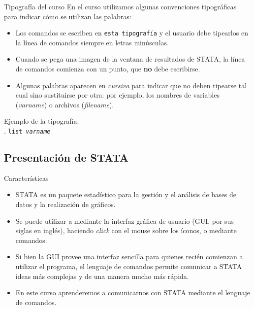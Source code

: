 \documentclass{beamer}
\begin{document}
\begin{frame}{Tipografía del curso}
En el curso utilizamos algunas convenciones tipográficas para indicar cómo se utilizan las palabras: 
\begin{itemize}
\item Los  comandos se escriben en \texttt{esta tipografía} y el usuario debe tipearlos en la línea de comandos siempre en letras minúsculas.
\item Cuando se pega una imagen de la ventana de resultados de STATA, la línea de comandos comienza con un punto, que \textbf{no} debe escribirse.  
\item Algunas palabras aparecen en \textit{cursiva} para indicar que no deben tipearse tal cual sino sustituirse por otra: por ejemplo, los nombres de variables (\textit{varname}) o archivos (\textit{filename}). 
\end{itemize}
\medskip
Ejemplo de la tipografía:\\
. \texttt{list \textit{varname}}
\end{frame}

\subsection{Presentación de STATA}


\begin{frame}{Características}
 \begin{itemize}
\item STATA es un paquete estadístico para la gestión y el análisis de bases de datos y la realización de gráficos. 
\item Se puede utilizar a mediante la interfaz gráfica de usuario (GUI, por sus siglas en inglés), haciendo \textit{click} con el mouse sobre los íconos, o mediante comandos.
\item Si bien la GUI provee una interfaz sencilla para quienes recién comienzan a utilizar el programa, el lenguaje de comandos permite comunicar a STATA ideas más complejas y de una manera mucho más rápida.
\item En este curso aprenderemos a comunicarnos con STATA mediante el lenguaje de comandos.
\end{itemize}
\end{frame}
\end{document}
